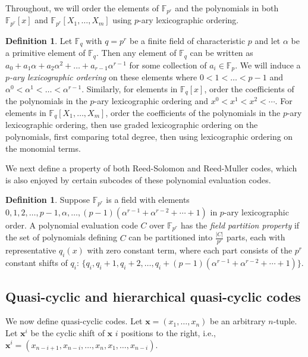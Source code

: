\documentclass[11pt]{amsart}
\theoremstyle{definition}
\newtheorem{definition}[theorem]{Definition}
\newcommand{\0}{\mathbf{0}}
\newcommand{\F}{\mathbb{F}}
\begin{document}
Throughout, we will order the elements of $\mathbb{F}_{p^r}$ and the polynomials in both $\mathbb{F}_{p^r}[x]$ and $\mathbb{F}_{p^r}[X_1, \ldots, X_m]$ using $p$-ary lexicographic ordering. 

\begin{definition} \label{def:pary}
    Let $\F_q$ with $q = p^r$ be a finite field of characteristic $p$ and let $\alpha$ be a primitive element of $\F_q$. Then any element of $\F_q$ can be written as $a_0 + a_1 \alpha + a_2 \alpha^2 + \dots + a_{r-1}\alpha^{r-1}$ for some collection of $a_i \in \F_p$. We will induce a \textit{$p$-ary lexicographic ordering} on these elements where $0 < 1 < \dots < p-1$ and $\alpha^0 < \alpha^1 < \dots < \alpha^{r-1}$. Similarly, for elements in $\F_q[x]$, order the coefficients of the polynomials in the $p$-ary lexicographic ordering and $x^0 < x^1< x^2 < \cdots$. For elements in $\mathbb{F}_{q}[X_1, \ldots, X_m]$,  order the coefficients of the polynomials in the $p$-ary lexicographic ordering, then use graded lexicographic ordering on the polynomials, first comparing total degree, then using lexicographic ordering on the monomial terms. 
\end{definition}

We next define a property of both Reed-Solomon and Reed-Muller codes, which is also enjoyed by certain subcodes of these polynomial evaluation codes. 

\begin{definition} \label{def:fieldpartition}
    Suppose $\mathbb{F}_{p^r}$ is a field with elements $0, 1,2, \ldots,p-1, \alpha, \ldots, (p-1)(\alpha^{r-1}+\alpha^{r-2}+\cdots +1) $ in $p$-ary lexicographic order. A polynomial evaluation code $C$ over $\mathbb{F}_{p^r}$ has the \textit{field partition property} if the set of polynomials defining $C$ can be partitioned into $\frac{|C|}{p^r}$ parts, each with representative $q_i(x)$ with zero constant term, where each part consists of the $p^r$ constant shifts of $q_i$: $\{q_i, q_i+1, q_i+2,\ldots, q_i+(p-1)(\alpha^{r-1}+\alpha^{r-2}+\cdots +1)\}$.
\end{definition}

\subsection{Quasi-cyclic and hierarchical quasi-cyclic codes}

We now define quasi-cyclic codes. Let $\mathbf{x} = (x_1, \dotsc, x_n)$ be an arbitrary $n$-tuple. Let $\mathbf{x}^i$ be the cyclic shift of $\mathbf{x}$ $i$ positions to the right, i.e., $\mathbf{x}^i = (x_{n-i+1}, x_{n-i}, \dotsc, x_{n}, x_1, \dotsc, x_{n-i})$.
\end{document}
